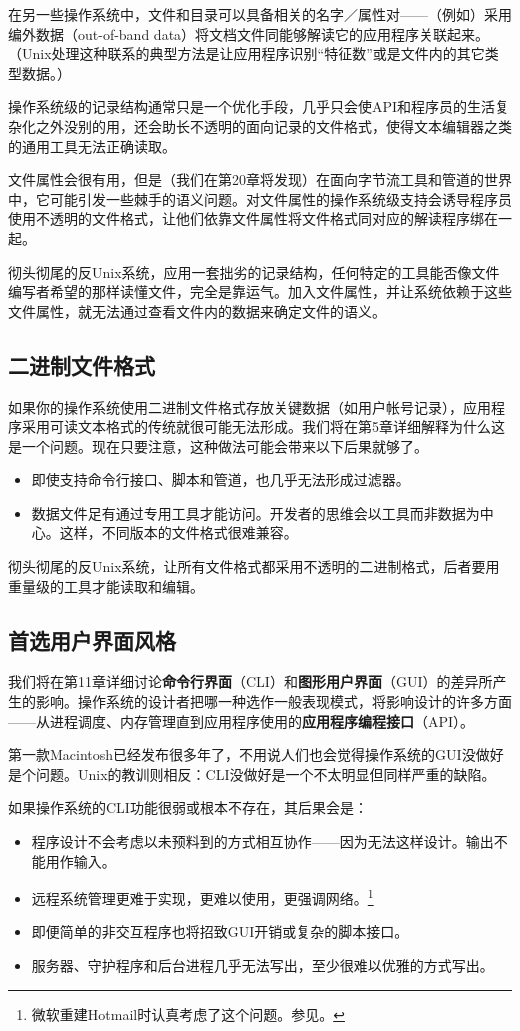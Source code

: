 \documentclass[12pt,oneside]{book}
\begin{document}
\begin{common-format}
在另一些操作系统中，文件和目录可以具备相关的名字／属性对——（例如）采用编外数据（out-of-band data）将文档文件同能够解读它的应用程序关联起来。（Unix处理这种联系的典型方法是让应用程序识别“特征数”或是文件内的其它类型数据。）

操作系统级的记录结构通常只是一个优化手段，几乎只会使API和程序员的生活复杂化之外没别的用，还会助长不透明的面向记录的文件格式，使得文本编辑器之类的通用工具无法正确读取。

文件属性会很有用，但是（我们在第20章将发现）在面向字节流工具和管道的世界中，它可能引发一些棘手的语义问题。对文件属性的操作系统级支持会诱导程序员使用不透明的文件格式，让他们依靠文件属性将文件格式同对应的解读程序绑在一起。

彻头彻尾的反Unix系统，应用一套拙劣的记录结构，任何特定的工具能否像文件编写者希望的那样读懂文件，完全是靠运气。加入文件属性，并让系统依赖于这些文件属性，就无法通过查看文件内的数据来确定文件的语义。

\subsection{二进制文件格式}
如果你的操作系统使用二进制文件格式存放关键数据（如用户帐号记录），应用程序采用可读文本格式的传统就很可能无法形成。我们将在第5章详细解释为什么这是一个问题。现在只要注意，这种做法可能会带来以下后果就够了。

\begin{itemize}
\item 即使支持命令行接口、脚本和管道，也几乎无法形成过滤器。
\item 数据文件足有通过专用工具才能访问。开发者的思维会以工具而非数据为中心。这样，不同版本的文件格式很难兼容。
\end{itemize}

彻头彻尾的反Unix系统，让所有文件格式都采用不透明的二进制格式，后者要用重量级的工具才能读取和编辑。

\subsection{首选用户界面风格}
我们将在第11章详细讨论\textbf{命令行界面}（CLI）和\textbf{图形用户界面}（GUI）的差异所产生的影响。操作系统的设计者把哪一种选作一般表现模式，将影响设计的许多方面——从进程调度、内存管理直到应用程序使用的\textbf{应用程序编程接口}（API）。

第一款Macintosh已经发布很多年了，不用说人们也会觉得操作系统的GUI没做好是个问题。Unix的教训则相反：CLI没做好是一个不太明显但同样严重的缺陷。

如果操作系统的CLI功能很弱或根本不存在，其后果会是：
\begin{itemize}
\item 程序设计不会考虑以未预料到的方式相互协作——因为无法这样设计。输出不能用作输入。
\item 远程系统管理更难于实现，更难以使用，更强调网络。\footnote{微软重建Hotmail时认真考虑了这个问题。参见\cite{BrooksD}。}
\item 即便简单的非交互程序也将招致GUI开销或复杂的脚本接口。
\item 服务器、守护程序和后台进程几乎无法写出，至少很难以优雅的方式写出。
\end{itemize}


\end{common-format}
\end{document}
